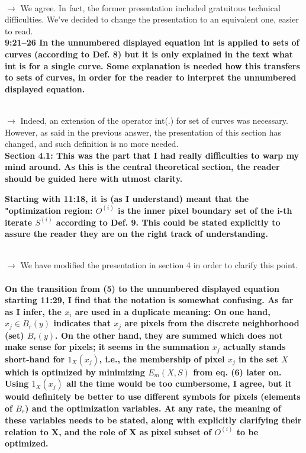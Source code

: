 \documentclass[12pt]{article}
\begin{document}
~\\
$\rightarrow$ We agree. In fact, the former presentation included gratuitous technical difficulties. We've decided to change the presentation to an equivalent one, easier to read.
~\\

\textbf{9:21--26 In the unnumbered displayed equation int is applied to sets of curves (according to Def. 8) but it is only explained in the text what int is for a single curve. Some explanation is needed how this transfers to sets of curves, in order for the reader to interpret the unnumbered displayed equation.}

~\\
$\rightarrow$ Indeed, an extension of the operator int(.) for set of curves was necessary. However, as said in the previous answer, the presentation of this section has changed, and such definition is no more needed.
~\\

\textbf{Section 4.1: This was the part that I had really difficulties to warp my mind
around. As this is the central theoretical section, the reader should be
guided here with utmost clarity.}


\textbf{Starting with 11:18, it is (as I understand) meant that the "optimization
region: $O^{(i)}$ is the inner pixel boundary set of the i-th iterate $S^{(i)}$
according to Def. 9. This could be stated explicitly to assure the reader they
are on the right track of understanding.}

~\\
$\rightarrow$ We have modified the presentation in section 4 in order to clarify this point.
~\\

\textbf{On the transition from (5) to the unnumbered displayed equation starting 11:29, I find that the notation is somewhat confusing. As far as I infer, the $x_i$ are used in a duplicate meaning: On one hand, $x_j\in B_r(y)$ indicates that $x_j$ are pixels from the discrete neighborhood (set) $B_r(y)$. On the other hand, they are summed which does not make sense for pixels; it seems in the summation $x_j$ actually stands short-hand for $1_X(x_j)$, i.e., the membership of pixel $x_j$ in the set $X$ which is optimized by minimizing $E_m(X,S)$ from eq. (6) later on. Using $1_X(x_j)$ all the time would be too cumbersome, I agree, but it would definitely be better to use different symbols for pixels (elements of $B_r$) and the optimization variables. At any rate, the meaning of these variables needs to be stated, along with explicitly clarifying their relation to X, and the role of X as pixel subset of $O^{(i)}$ to be optimized.}
\end{document}
